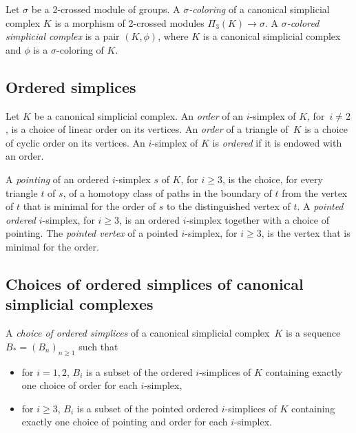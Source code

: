 \documentclass[a4paper, oneside]{amsart}
\numberwithin{equation}{subsection}
\theoremstyle{referencedlemma}
\theoremstyle{plain} %
\theoremstyle{remark}
\begin{document}
Let $\sigma$ be a 2-crossed module of groups. A \emph{$\sigma$-coloring} of a canonical simplicial complex $K$ is a morphism of 2-crossed modules $\Pi_3(K) \to \sigma$.  A \emph{$\sigma$-colored simplicial complex} is a pair $(K,\phi)$, where $K$ is a canonical simplicial complex and $\phi$ is a $\sigma$-coloring of $K$.

\subsection{Ordered simplices}\label{Section_Ordered simplices}Let $K$ be a canonical simplicial complex. An \emph{order} of an $i$-simplex of $K$, for~$i\neq 2$, is  a choice of linear order on its vertices. An \emph{order} of a triangle of~$K$ is a choice of cyclic order on its vertices. An $i$-simplex of $K$ is \emph{ordered} if it is endowed with an order.

A \emph{pointing} of an ordered $i$-simplex $s$ of $K$, for $i\geqslant 3$, is the choice, for every triangle $t$ of $s$, of a homotopy class of paths in the boundary of $t$ from the vertex of $t$ that is minimal for the order of $s$ to the distinguished vertex of $t$. A \emph{pointed ordered} $i$-simplex, for $i\geqslant 3$, is an ordered $i$-simplex together with a choice of pointing. The \emph{pointed vertex} of a pointed $i$-simplex, for $i\geqslant 3$, is the vertex that is minimal for the order.

\subsection{Choices of ordered simplices of canonical simplicial complexes}\label{Subsection_Choices of ordered simplices}
A \emph{choice of ordered simplices} of a canonical simplicial complex~$K$ is a sequence $B_* = (B_n)_{n\geqslant 1}$ such that
\begin{itemize}
\item for $i = 1, 2$, $B_i$ is a subset of the ordered $i$-simplices of $K$ containing exactly one choice of order for each $i$-simplex,
\item for $i\geqslant 3$, $B_i$ is a subset of the pointed ordered $i$-simplices of $K$ containing exactly one choice of pointing and order for each $i$-simplex.
\end{itemize}
\end{document}
